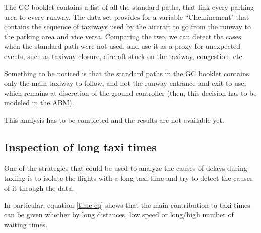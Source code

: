 \documentclass{article}
\begin{document}
The GC booklet \cite{livret} contains a list of all the standard paths, that link every parking area to every runway. The data set provides for a variable ``Cheminement" that contains the sequence of taxiways used by the aircraft to go from the runway to the parking area and vice versa. Comparing the two, we can detect the cases when the standard path were not used, and use it as a proxy for unexpected events, such as taxiway closure, aircraft stuck on the taxiway, congestion, etc..

Something to be noticed is that the standard paths in the GC booklet contains only the main taxiway to follow, and not the runway entrance and exit to use, which remains at discretion of the ground controller (then, this decision has to be modeled in the ABM).

This analysis has to be completed and the results are not available yet.


\subsection{Inspection of long taxi times}

One of the strategies that could be used to analyze the causes of delays during taxiing is to isolate the flights with a long taxi time and try to detect the causes of it through the data. 

In particular, equation \ref{time-eq} shows that the main contribution to taxi times can be given whether by long distances, low speed or long/high number of waiting times.
\end{document}

